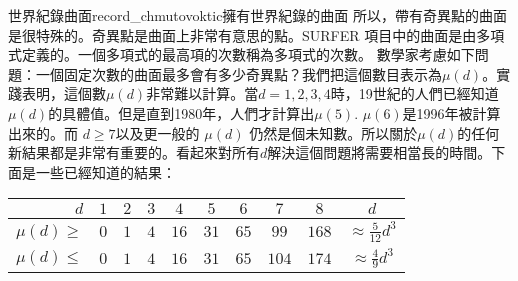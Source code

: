 \begin{surferIntroPage}{世界紀錄曲面}{record_chmutovoktic}{擁有世界紀錄的曲面}
所以，帶有奇異點的曲面是很特殊的。奇異點是曲面上非常有意思的點。SURFER 項目中的曲面是由多項式定義的。一個多項式的最高項的次數稱為多項式的次數。
數學家考慮如下問題：一個固定次數的曲面最多會有多少奇異點？我們把這個數目表示為$\mu(d)$。實踐表明，這個數$\mu(d)$非常難以計算。當$d=1,2,3,4$時，19世紀的人們已經知道$\mu(d)$的具體值。但是直到1980年，人們才計算出$\mu(5)$.
$\mu(6)$是1996年被計算出來的。而 $d\ge 7$以及更一般的 $\mu(d)$ 仍然是個未知數。所以關於$\mu(d)$的任何新結果都是非常有重要的。看起來對所有$d$解決這個問題將需要相當長的時間。下面是一些已經知道的結果：
   \begin{center}
      \begin{tabular}{r|cccccccc|c}
        $d$ & $1$ & $2$ & $3$ & $4$ & $5$ & $6$ & $7$ & $8$ & $d$\\
        \hline
        \hline
        \rule{0pt}{1.2em}$\mu(d)\ge$ & $0$ & $1$ & $4$ & $16$ & $31$ & $65$ &
        $99$ & $168$ &
        $\approx \frac{5}{12}d^3$\\[0.3em]
        \hline
        \rule{0pt}{1.2em}$\mu(d)\le$ & $0$ & $1$ & $4$ & $16$ & $31$ & $65$ &
        $104$ & $174$ & $\approx \frac{4}{9}d^3$
      \end{tabular}
    \end{center}
\end{surferIntroPage}

